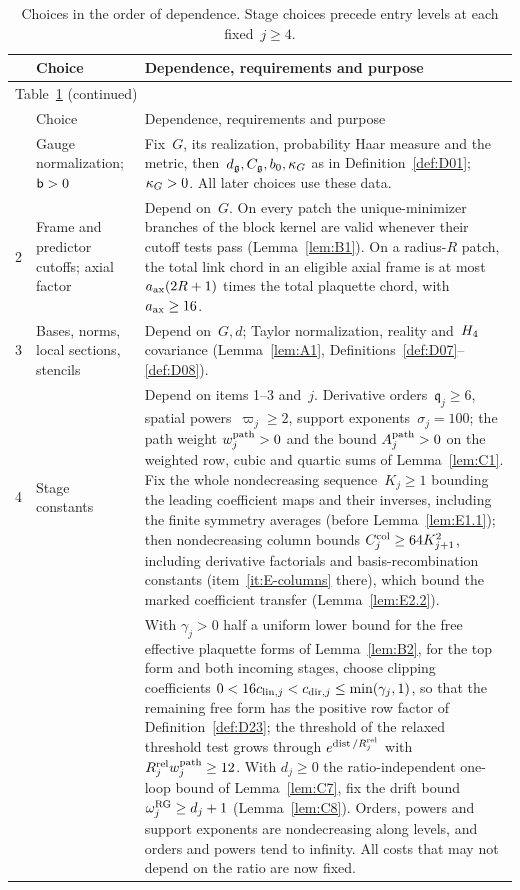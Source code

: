 \begingroup
\small
\setlength{\tabcolsep}{4pt}
\setlength{\LTpre}{0pt}
\setlength{\LTpost}{0pt}
\setlength{\LTcapwidth}{\textwidth}
\setlength{\abovecaptionskip}{3pt}
\setlength{\belowcaptionskip}{3pt}
\begin{longtable}{@{}p{}p{}p{}@{}}
\caption{Choices in the order of dependence. Stage choices precede entry levels at each fixed~$j\ge4$.}\label{tab:constant-choices}\\
\hline
 & Choice & Dependence, requirements and purpose \\
\hline
\endfirsthead
\multicolumn{3}{l}{Table~\ref{tab:constant-choices} (continued)}\\
\hline
 & Choice & Dependence, requirements and purpose \\
\hline
\endhead
\hline
\endfoot
1 & \raggedright Gauge normalization; $\mathsf{b}>0$ & Fix~$G$, its realization, probability Haar measure and the metric, then~$d_{\mathfrak{g}},C_{\mathfrak{g}},b_0,\kappa_G$ as in Definition~\ref{def:D01}; $\kappa_G>0$. All later choices use these data.\\[3pt]
2 & \raggedright Frame and predictor cutoffs; axial factor & Depend on~$G$. On every patch the unique-minimizer branches of the block kernel are valid whenever their cutoff tests pass (Lemma~\ref{lem:B1}). On a radius-$R$ patch, the total link chord in an eligible axial frame is at most $a_{\rm ax}(2R+1)$ times the total plaquette chord, with $a_{\rm ax}\ge16$.\\[3pt]
3 & \raggedright Bases, norms, local sections, stencils & Depend on~$G,d$; Taylor normalization, reality and~$H_4$ covariance (Lemma~\ref{lem:A1}, Definitions~\ref{def:D07}--\ref{def:D08}).\\[3pt]
4 & \raggedright Stage constants & Depend on items 1--3 and~$j$. Derivative orders~$\mathfrak q_j\ge6$, spatial powers~$\varpi_j\ge2$, support exponents~$\sigma_j=100$; the path weight $w_j^{\rm path}>0$ and the bound $A_j^{\rm path}>0$ on the weighted row, cubic and quartic sums of Lemma~\ref{lem:C1}. Fix the whole nondecreasing sequence~$K_j\ge1$ bounding the leading coefficient maps and their inverses, including the finite symmetry averages (before Lemma~\ref{lem:E1.1}); then nondecreasing column bounds $C^{\mathrm{col}}_{j}\ge64K_{j+1}^2$, including derivative factorials and basis-recombination constants (item~\ref{it:E-columns} there), which bound the marked coefficient transfer (Lemma~\ref{lem:E2.2}).\\[3pt]
 & & With $\gamma_j>0$ half a uniform lower bound for the free effective plaquette forms of Lemma~\ref{lem:B2}, for the top form and both incoming stages, choose clipping coefficients $0<16c_{{\rm lin},j}<c_{{\rm dir},j}\le\min(\gamma_j,1)$, so that the remaining free form has the positive row factor of Definition~\ref{def:D23}; the threshold of the relaxed threshold test grows through $e^{\operatorname{dist}/R_j^{\rm rel}}$ with $R_j^{\rm rel}w_j^{\rm path}\ge12$. With $d_j\ge0$ the ratio-independent one-loop bound of Lemma~\ref{lem:C7}, fix the drift bound $\omega_j^{\rm RG}\ge d_j+1$ (Lemma~\ref{lem:C8}). Orders, powers and support exponents are nondecreasing along levels, and orders and powers tend to infinity. All costs that may not depend on the ratio are now fixed.\\[3pt]

\end{longtable}
